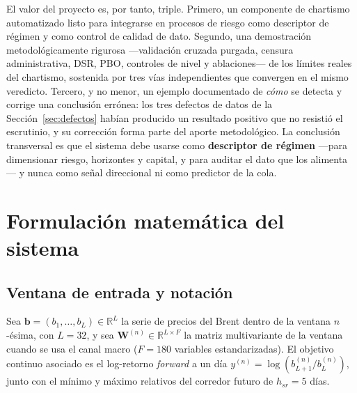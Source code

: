 \documentclass[11pt,a4paper]{article}
\begin{document}
El valor del proyecto es, por tanto, triple. Primero, un componente de chartismo
automatizado listo para integrarse en procesos de riesgo como descriptor de
régimen y como control de calidad de dato. Segundo, una demostración
metodológicamente rigurosa —validación cruzada purgada, censura administrativa,
DSR, PBO, controles de nivel y ablaciones— de los límites reales del chartismo,
sostenida por tres vías independientes que convergen en el mismo veredicto.
Tercero, y no menor, un ejemplo documentado de \emph{cómo} se detecta y corrige
una conclusión errónea: los tres defectos de datos de la
Sección~\ref{sec:defectos} habían producido un resultado positivo que no
resistió el escrutinio, y su corrección forma parte del aporte metodológico. La
conclusión transversal es que el sistema debe usarse como \textbf{descriptor de
régimen} —para dimensionar riesgo, horizontes y capital, y para auditar el dato
que los alimenta— y nunca como señal direccional ni como predictor de la cola.

\appendix
\section{Formulación matemática del sistema}
\label{ap:matematica}

\subsection{Ventana de entrada y notación}
Sea $\mathbf{b} = (b_1,\dots,b_L) \in \mathbb{R}^{L}$ la serie de precios del
Brent dentro de la ventana $n$-ésima, con $L=32$, y sea
$\mathbf{W}^{(n)} \in \mathbb{R}^{L\times F}$ la matriz multivariante de la
ventana cuando se usa el canal macro ($F=180$ variables estandarizadas). El
objetivo continuo asociado es el log-retorno \emph{forward} a un día
$y^{(n)} = \log(b^{(n)}_{L+1}/b^{(n)}_{L})$, junto con el mínimo y máximo
relativos del corredor futuro de $h_{sr}=5$ días.
\end{document}
